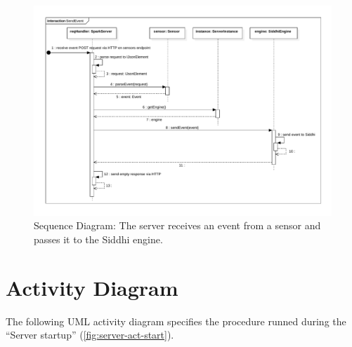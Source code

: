 \begin{figure}[h]
    \centering
    \includegraphics[width=\textwidth]{../module_res/server-sd-sendevent.pdf}
    \caption{Sequence Diagram:
        The server receives an event from a sensor and passes it to the Siddhi
        engine.
    \label{fig:server-sd-sendevent}}
\end{figure}
\FloatBarrier


\section{Activity Diagram}
The following UML activity diagram specifies the procedure runned during the
\enquote{Server startup} (\autoref{fig:server-act-start}).

